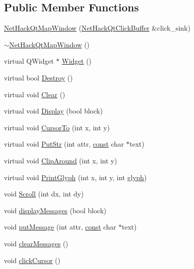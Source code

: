 \subsection*{Public Member Functions}
\begin{DoxyCompactItemize}
\item 
\hyperlink{classNetHackQtMapWindow_a0ca4ede317cb91da1626f73895841844}{Net\+Hack\+Qt\+Map\+Window} (\hyperlink{classNetHackQtClickBuffer}{Net\+Hack\+Qt\+Click\+Buffer} \&click\+\_\+sink)
\item 
\hyperlink{classNetHackQtMapWindow_abcfb4a055b264fe64e844cb7c6ab2ab9}{$\sim$\+Net\+Hack\+Qt\+Map\+Window} ()
\item 
virtual Q\+Widget $\ast$ \hyperlink{classNetHackQtMapWindow_a5f4e96f22a17d2091cb828cee2cfb2f1}{Widget} ()
\item 
virtual bool \hyperlink{classNetHackQtMapWindow_a18d4cdda9845c4f7e9d87da401fc27bc}{Destroy} ()
\item 
virtual void \hyperlink{classNetHackQtMapWindow_a79abd358a531ceb72d424ff7ee9b4485}{Clear} ()
\item 
virtual void \hyperlink{classNetHackQtMapWindow_a0379eda778d43ff0186270807d8f9a4d}{Display} (bool block)
\item 
virtual void \hyperlink{classNetHackQtMapWindow_a3cc4d404d13a9dbe39a3ccbce1ea2e88}{Cursor\+To} (int x, int y)
\item 
virtual void \hyperlink{classNetHackQtMapWindow_a44e85e23549b34c5f878ccd9d053d024}{Put\+Str} (int attr, \hyperlink{tradstdc_8h_a2c212835823e3c54a8ab6d95c652660e}{const} char $\ast$text)
\item 
virtual void \hyperlink{classNetHackQtMapWindow_a91529022a521afa412a6db5a51248776}{Clip\+Around} (int x, int y)
\item 
virtual void \hyperlink{classNetHackQtMapWindow_a0b7c1802cae9e787763747627280a3d8}{Print\+Glyph} (int x, int y, int \hyperlink{classNetHackQtMapWindow_ae1ffb32e364b3b4a4f7e942177740fbe}{glyph})
\item 
void \hyperlink{classNetHackQtMapWindow_aac6ca09cb7e3db282258f883b9fb66cb}{Scroll} (int dx, int dy)
\item 
void \hyperlink{classNetHackQtMapWindow_a984ab0c165e62d15f44e7adc6994cfcf}{display\+Messages} (bool block)
\item 
void \hyperlink{classNetHackQtMapWindow_a6ac1ee08c7f46634a3b0b6bbaeb86950}{put\+Message} (int attr, \hyperlink{tradstdc_8h_a2c212835823e3c54a8ab6d95c652660e}{const} char $\ast$text)
\item 
void \hyperlink{classNetHackQtMapWindow_a3d24d8040ec3e66b03ef5723976a9bc3}{clear\+Messages} ()
\item 
void \hyperlink{classNetHackQtMapWindow_a7ce010065cb6a6dceaf340a429c50113}{click\+Cursor} ()
\end{DoxyCompactItemize}
